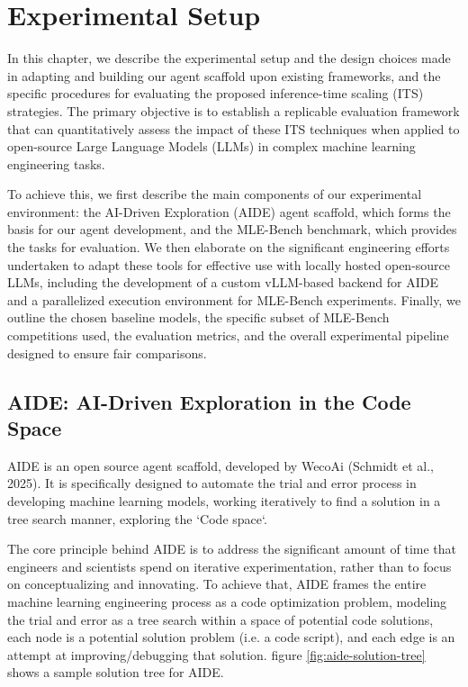 \chapter{Experimental Setup}

In this chapter, we describe the experimental setup and the design choices made in adapting and building our agent scaffold upon existing frameworks, and the specific procedures for evaluating the proposed inference-time scaling (ITS) strategies. The primary objective is to establish a replicable evaluation framework that can quantitatively assess the impact of these ITS techniques when applied to open-source Large Language Models (LLMs) in complex machine learning engineering tasks.

To achieve this, we first describe the main components of our experimental environment: the AI-Driven Exploration (AIDE) agent scaffold, which forms the basis for our agent development, and the MLE-Bench benchmark, which provides the tasks for evaluation. We then elaborate on the significant engineering efforts undertaken to adapt these tools for effective use with locally hosted open-source LLMs, including the development of a custom vLLM-based backend for AIDE and a parallelized execution environment for MLE-Bench experiments. Finally, we outline the chosen baseline models, the specific subset of MLE-Bench competitions used, the evaluation metrics, and the overall experimental pipeline designed to ensure fair comparisons.

\section{AIDE: AI-Driven Exploration in the Code Space}
AIDE is an open source agent scaffold, developed by WecoAi (Schmidt et al., 2025). It is specifically designed to automate the trial and error process in developing machine learning models, working iteratively to find a solution in a tree search manner, exploring the `Code space`. 

The core principle behind AIDE is to address the significant amount of time that engineers and scientists spend on iterative experimentation, rather than to focus on conceptualizing and innovating.  To achieve that, AIDE frames the entire machine learning engineering process as a code optimization problem, modeling the trial and error as a tree search within a space of potential code solutions, each node is a potential solution problem (i.e. a code script), and each edge is an attempt at improving/debugging that solution. figure \ref{fig:aide-solution-tree} shows a sample solution tree for AIDE.


